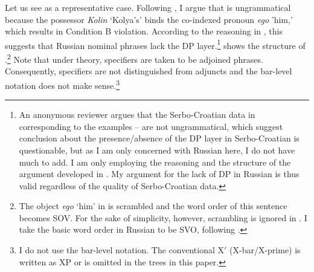 \documentclass[output=paper,
]{langscibook}
\begin{document}
\begin{exe}\ex\label{bind2}
\begin{xlist}
\end{xlist}
\end{exe}
\begin{exe}\ex\label{bind3}
\begin{xlist}
\end{xlist}
\end{exe}

\noindent
Let us see  as a representative case. 
Following \citet{Despic2013}, I argue that  is ungrammatical because the possessor \textit{Kolin} `Kolya's' binds the co-indexed pronoun \textit{ego} 'him,' which results in Condition B violation. 
According to the reasoning in \citet{Despic2013}, this suggests that Russian nominal phrases lack the DP layer.\footnote{An anonymous reviewer argues that the Serbo-Croatian data in \citet{Despic2013} corresponding to the examples -- are not ungrammatical, which suggest  conclusion about the presence/absence of the DP layer in Serbo-Croatian is questionable, but as I am only concerned with Russian here, I do not have much to add. I am only employing the reasoning and the structure of the argument developed in \cite{Despic2013}. My argument for the lack of DP in Russian is thus valid regardless of the quality of  Serbo-Croatian data.}  shows the structure of .\footnote{The object \textit{ego} `him' in   is scrambled and the word order of this sentence becomes SOV. For the sake of simplicity, however, scrambling is ignored in . I take the basic word order in Russian to be SVO, following \citet{Isachenko1966}.}  
Note that under  theory, specifiers are taken to be adjoined phrases. Consequently, specifiers are not distinguished from adjuncts and the bar-level notation does not make sense.\footnote{I do not use the bar-level notation. The conventional X$'$ (X-bar/X-prime) is written as XP or is omitted in the trees in this paper.} 
\end{document}
